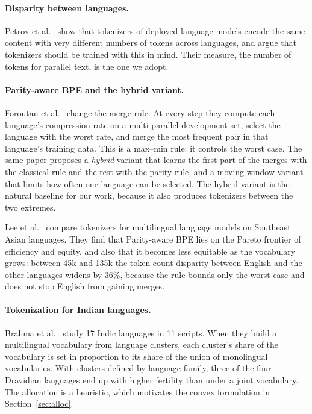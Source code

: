 \documentclass[11pt,a4paper]{article}
\theoremstyle{remark}
\begin{document}
\paragraph{Disparity between languages.}
Petrov et al.\ \cite{petrov2023} show that tokenizers of deployed language models encode the
same content with very different numbers of tokens across languages, and argue that
tokenizers should be trained with this in mind. Their measure, the number of tokens for
parallel text, is the one we adopt.

\paragraph{Parity-aware BPE and the hybrid variant.}
Foroutan et al.\ \cite{foroutan2026} change the merge rule. At every step they compute each
language's compression rate on a multi-parallel development set, select the language with
the worst rate, and merge the most frequent pair in that language's training data. This is a
max--min rule: it controls the worst case. The same paper proposes a \emph{hybrid} variant
that learns the first part of the merges with the classical rule and the rest with the
parity rule, and a moving-window variant that limits how often one language can be selected.
The hybrid variant is the natural baseline for our work, because it also produces
tokenizers between the two extremes.

Lee et al.\ \cite{lee2026} compare tokenizers for multilingual language models on
Southeast Asian languages. They find that Parity-aware BPE lies on the Pareto frontier of
efficiency and equity, and also that it becomes less equitable as the vocabulary grows:
between 45k and 135k the token-count disparity between English and the other languages
widens by 36\%, because the rule bounds only the worst case and does not stop English from
gaining merges.

\paragraph{Tokenization for Indian languages.}
Brahma et al.\ \cite{brahma2026} study 17 Indic languages in 11 scripts. When they build a
multilingual vocabulary from language clusters, each cluster's share of the vocabulary is
set in proportion to its share of the union of monolingual vocabularies. With clusters
defined by language family, three of the four Dravidian languages end up with higher
fertility than under a joint vocabulary. The allocation is a heuristic, which motivates the
convex formulation in Section~\ref{sec:alloc}.
\end{document}
